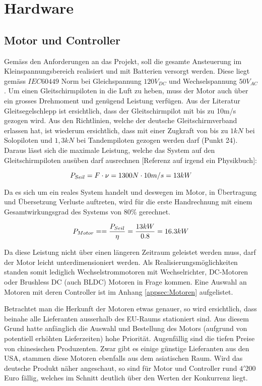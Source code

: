 \section{Hardware}\label{sec:Hardware}

\subsection{Motor und Controller}\label{subsec:MotorController}
Gemäss den Anforderungen an das Projekt, soll die gesamte Ansteuerung im Kleinspannungsbereich realisiert und mit Batterien versorgt werden. Diese liegt gemäss $ IEC 60449 $ Norm bei Gleichspannung $120V_{DC}$ und Wechselspannung $50V_{AC}$. Um einen Gleitschirmpiloten in die Luft zu heben, muss der Motor auch über ein grosses Drehmoment und genügend Leistung verfügen. Aus der Literatur Gleitsegelschlepp \cite{Gleitsegelschlepp} ist ersichtlich, dass der Gleitschirmpilot mit bis zu 10m/s gezogen wird. Aus den Richtlinien, welche der deutsche Gleitschirmverband erlassen hat, ist wiederum ersichtlich, dass mit einer Zugkraft von bis zu $ 1kN $ bei Solopiloten und $ 1,3kN $ bei Tandempiloten gezogen werden darf \cite{WindenProtokoll} (Punkt 24). Daraus lässt sich die maximale Leistung, welche das System auf den Gleitschirmpiloten ausüben darf ausrechnen [Referenz auf irgend ein Physikbuch]:


\begin{equation}
\centering
	P_{Seil}=F \cdot \nu=1300N \cdot 10m/s=13kW
\label{eq:LeistungSeil}
\end{equation}

Da es sich um ein reales System handelt und deswegen im Motor, in Übertragung und Übersetzung Verluste auftreten, wird für die erste Handrechnung mit einem Gesamtwirkungsgrad des Systems von $80\%$ gerechnet.

\begin{equation}
\centering
	P_{Motor}==\frac{P_{Seil}}{\eta}=\frac{13kW}{0.8}=16.3kW
\label{eq:LeistungMotor}
\end{equation}

Da diese Leistung nicht über einen längeren Zeitraum geleistet werden muss, darf der Motor leicht unterdimensioniert werden. Als Realisierungsmöglichkeiten standen somit lediglich Wechselstrommotoren mit Wechselrichter, DC-Motoren oder Brushless DC (auch BLDC) Motoren in Frage kommen. Eine Auswahl an Motoren mit deren Controller ist im Anhang \ref{appsec:Motoren} aufgelistet.

Betrachtet man die Herkunft der Motoren etwas genauer, so wird ersichtlich, dass beinahe alle Lieferanten ausserhalb des EU-Raums stationiert sind. Aus diesem Grund hatte anfänglich die Auswahl und Bestellung des Motors (aufgrund von potentiell erhöhten Lieferzeiten) hohe Priorität.  
Augenfällig sind die tiefen Preise von chinesischen Produzenten. Zwar gibt es einige günstige Lieferanten aus den USA, stammen diese Motoren ebenfalls aus dem asiatischen Raum. Wird das deutsche Produkt näher angeschaut, so sind für Motor und Controller rund $ 4'200 $ Euro fällig, welches im Schnitt deutlich über den Werten der Konkurrenz liegt.

